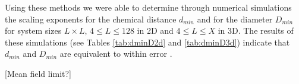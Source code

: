 \documentclass[aps, preprint, groupedaddress]{revtex4-1}
\begin{document}


Using these methods we were able to determine through numerical simulations the scaling exponents for the chemical distance $d_{min}$ and for the diameter $D_{min}$ for system sizes $L \times  L$, $4 \le L \le 128$ in 2D and   $4 \le L \le X$ in 3D.  The results of these simulations (see Tables \ref{tab:dminD2d} and \ref{tab:dminD3d}) indicate that $d_{min}$ and $D_{min}$ are equivalent to within error .  




[Mean field limit?]






\end{document}
